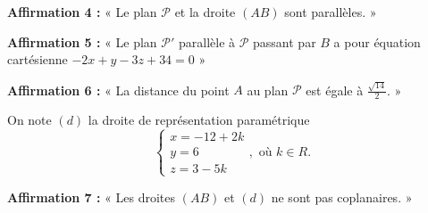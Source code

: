 \textbf{Affirmation 4 :} « Le plan $\mathcal{P}$ et la droite $(AB)$ sont parallèles. »

\smallskip

\textbf{Affirmation 5 :} « Le plan $\mathcal{P}'$ parallèle à $\mathcal{P}$ passant par $B$ a pour équation cartésienne $-2 x+y-3 z+34=0$ »

\smallskip

\textbf{Affirmation 6 :} « La distance du point $A$ au plan $\mathcal{P}$ est égale à $\frac{\sqrt{14}}{2}$. »

\medskip

On note $(d)$ la droite de représentation paramétrique \[ \begin{cases}x=-12+2k\\y=6\\z=3-5k\end{cases}, \text { où } k \in R.\]

\textbf{Affirmation 7 :} « Les droites $(AB)$ et $(d)$ ne sont pas coplanaires. »